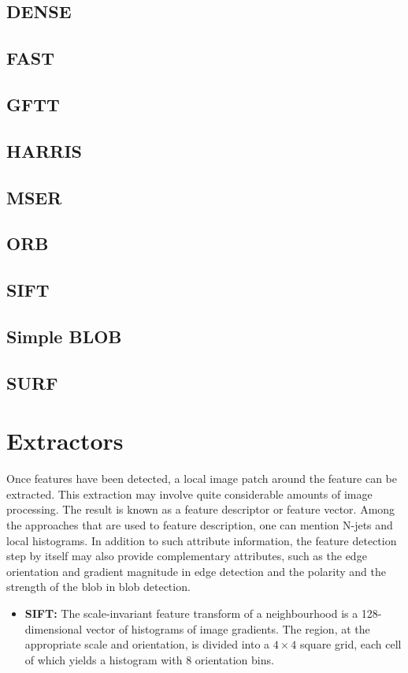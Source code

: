 \subsection*{DENSE}
\subsection*{FAST}
\subsection*{GFTT}
\subsection*{HARRIS}
\subsection*{MSER}
\subsection*{ORB}
\subsection*{SIFT}
\subsection*{Simple BLOB}
\subsection*{SURF}

\section{Extractors}
Once features have been detected, a local image patch around the feature can be extracted. This extraction may involve quite considerable amounts of image processing. The result is known as a feature descriptor or feature vector. Among the approaches that are used to feature description, one can mention N-jets and local histograms. In addition to such attribute information, the feature detection step by itself may also provide complementary attributes, such as the edge orientation and gradient magnitude in edge detection and the polarity and the strength of the blob in blob detection.

\begin{itemize}
	\item \textbf{SIFT:} The scale-invariant feature transform of a neighbourhood is a 128-dimensional vector of histograms of image gradients. The region, at the appropriate scale and orientation, is divided into a $4\times 4$ square grid, each cell of which yields a histogram with 8 orientation bins.
\end{itemize}
